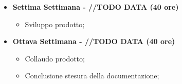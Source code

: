 {\begin{itemize}
\begin{itemize}
        \end{itemize}
        \item \textbf{Settima Settimana - //TODO DATA (40 ore)} 
        \begin{itemize}
            \item Sviluppo prodotto;
        \end{itemize}
        \item \textbf{Ottava Settimana - //TODO DATA (40 ore)} 
        \begin{itemize}
            \item Collaudo prodotto;
            \item Conclusione stesura della documentazione;
        \end{itemize}
    \end{itemize}
}

\newcommand{\totaleOre}{305}

\newcommand{\obiettiviObbligatori}{
	 \item \underline{\textit{O01}}: visualizzazione interattiva volumetrica;
	 \item \underline{\textit{O02}}: possibilità di scelta della funzione trasferimento;
	 
}

\newcommand{\obiettiviDesiderabili}{
	 \item \underline{\textit{D01}}: piani di taglio del volume;
	 \item \underline{\textit{D02}}: modifiche alla funzione taglio;
	 \item \underline{\textit{D03}}: ottimizzazione rendering GPU;
}

\newcommand{\obiettiviFacoltativi}{
	 \item \underline{\textit{F01}}: segmentazione VTK/ITK?;
	 \item \underline{\textit{F02}}: analisi unit-testing su GUI-Qt;
	 \item \underline{\textit{F03}}: porting librerie aziendali su CMake;
}